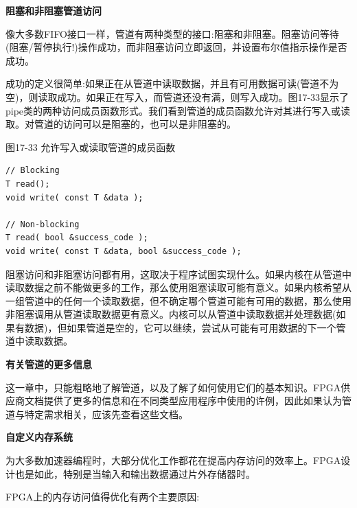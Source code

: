 \hspace*{\fill} \par %
\textbf{阻塞和非阻塞管道访问}

像大多数FIFO接口一样，管道有两种类型的接口:阻塞和非阻塞。阻塞访问等待(阻塞/暂停执行!)操作成功，而非阻塞访问立即返回，并设置布尔值指示操作是否成功。\par

成功的定义很简单:如果正在从管道中读取数据，并且有可用数据可读(管道不为空)，则读取成功。如果正在写入，而管道还没有满，则写入成功。图17-33显示了pipe类的两种访问成员函数形式。我们看到管道的成员函数允许对其进行写入或读取。对管道的访问可以是阻塞的，也可以是非阻塞的。\par

\hspace*{\fill} \par %
图17-33 允许写入或读取管道的成员函数
\begin{lstlisting}[caption={}]
// Blocking
T read();
void write( const T &data );

// Non-blocking
T read( bool &success_code );
void write( const T &data, bool &success_code ); 
\end{lstlisting}

阻塞访问和非阻塞访问都有用，这取决于程序试图实现什么。如果内核在从管道中读取数据之前不能做更多的工作，那么使用阻塞读取可能有意义。如果内核希望从一组管道中的任何一个读取数据，但不确定哪个管道可能有可用的数据，那么使用非阻塞调用从管道读取数据更有意义。内核可以从管道中读取数据并处理数据(如果有数据)，但如果管道是空的，它可以继续，尝试从可能有可用数据的下一个管道中读取数据。\par

\hspace*{\fill} \par %
\textbf{有关管道的更多信息}

这一章中，只能粗略地了解管道，以及了解了如何使用它们的基本知识。FPGA供应商文档提供了更多的信息和在不同类型应用程序中使用的许例，因此如果认为管道与特定需求相关，应该先查看这些文档。\par

\hspace*{\fill} \par %
\textbf{自定义内存系统}

为大多数加速器编程时，大部分优化工作都花在提高内存访问的效率上。FPGA设计也是如此，特别是当输入和输出数据通过片外存储器时。\par

FPGA上的内存访问值得优化有两个主要原因:\par

